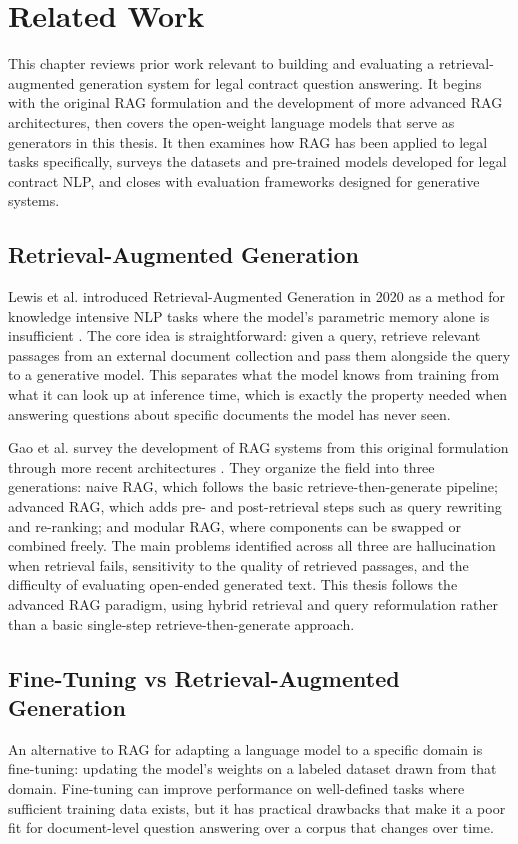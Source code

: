 \chapter{Related Work}
\label{chap2}


This chapter reviews prior work relevant to building and evaluating a 
retrieval-augmented generation system for legal contract question answering. 
It begins with the original RAG formulation and the development of more 
advanced RAG architectures, then covers the open-weight language models 
that serve as generators in this thesis. It then examines how RAG has been 
applied to legal tasks specifically, surveys the datasets and pre-trained 
models developed for legal contract NLP, and closes with evaluation 
frameworks designed for generative systems.

\section{Retrieval-Augmented Generation}
Lewis et al. introduced Retrieval-Augmented Generation in 2020 as a method for knowledge intensive NLP tasks where the model's parametric memory alone is insufficient \cite{lewis2020rag}. The core idea is straightforward: given a query, retrieve relevant passages from an external document collection and pass them alongside the query to a generative model. This separates what the model knows from training from what it can look up at inference time, which is exactly the property needed when answering questions about specific documents the model has never seen.

Gao et al. survey the development of RAG systems from this original formulation through more recent architectures \cite{gao2024ragsurvey}. They organize the field into three generations: naive RAG, which follows the basic retrieve-then-generate pipeline; advanced RAG, which adds pre- and post-retrieval steps such as query rewriting and re-ranking; and modular RAG, where components can be swapped or combined freely. The main problems identified across all three are hallucination when retrieval fails, sensitivity to the quality of retrieved passages, and the difficulty of evaluating open-ended generated text. This thesis follows the advanced RAG paradigm, using hybrid retrieval and query reformulation rather than a basic single-step retrieve-then-generate approach.

\section{Fine-Tuning vs Retrieval-Augmented Generation}
An alternative to RAG for adapting a language model to a specific domain is fine-tuning: updating the model's weights on a labeled dataset drawn from that domain. Fine-tuning can improve performance on well-defined tasks where sufficient training data exists, but it has practical drawbacks that make it a poor fit for document-level question answering over a corpus that changes over time.

